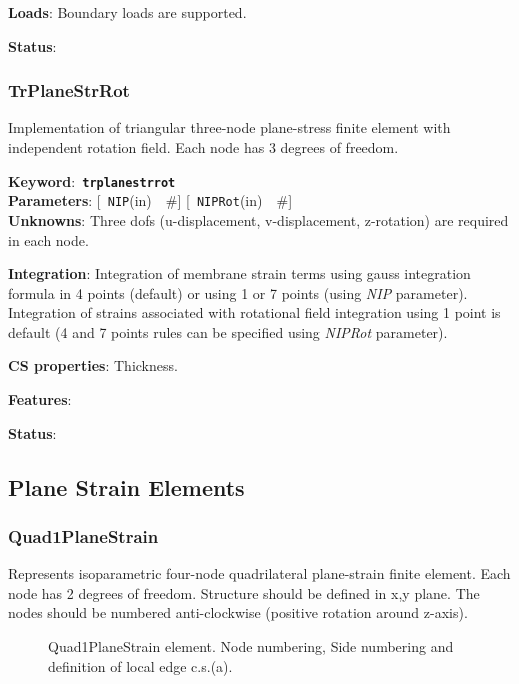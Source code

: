 \documentclass[a4paper]{article}
\newcommand{\descitem}[1]{{\noindent \bf #1}:}
\newcommand{\elemkeyword}[1]{\descitem{Keyword}~{\bf \texttt{#1}}}
\newcommand{\elemparam}[2]{{{\texttt{#1}\tiny (#2)}~~\#}}
\newcommand{\optelemparam}[2]{{[~\elemparam{#1}{#2}]}}
\newcommand{\param}[1]{{\em #1}}
\begin{document}
\descitem{Loads} Boundary loads are supported.

\descitem{Status} 

\subsubsection{TrPlaneStrRot}
Implementation of triangular three-node  plane-stress 
finite element with independent rotation field.
Each node has 3 degrees of freedom.

\elemkeyword{trplanestrrot}\\
\descitem{Parameters} \optelemparam{NIP}{in} \optelemparam{NIPRot}{in}\\
\descitem{Unknowns}
Three dofs (u-displacement, v-displacement, z-rotation) are required in each node.


\descitem{Integration}
Integration of membrane strain terms using gauss integration formula
in 4 points (default) or using 1 or 7 points (using \param{NIP} parameter).
Integration of strains associated with rotational field 
integration using 1 point is default (4 and 7 points rules can be
specified using \param{NIPRot} parameter).

\descitem{CS properties} Thickness. 

\descitem{Features} 

\descitem{Status} 

\subsection{Plane Strain Elements}

\subsubsection{Quad1PlaneStrain}
Represents isoparametric four-node quadrilateral plane-strain
finite element. Each node has 2 degrees of freedom.
Structure should be defined in x,y plane. 
The nodes should be numbered anti-clockwise (positive rotation around
z-axis). 

\begin{figure}[tb]
 \centering
 \begin{makeimage}
  
 \end{makeimage}
 \caption{Quad1PlaneStrain element. Node numbering, Side numbering and
 definition of local edge c.s.(a).}
 \label{Quad1PlaneStrainfig}
\end{figure}
\end{document}
